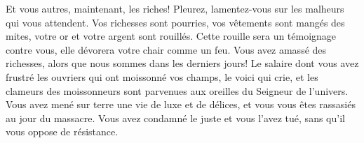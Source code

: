 Et vous autres, maintenant, les riches!
	Pleurez, lamentez-vous sur les malheurs qui vous attendent.
Vos richesses sont pourries, vos vêtements sont mangés des mites,
	votre or et votre argent sont rouillés.
Cette rouille sera un témoignage contre vous,
	elle dévorera votre chair comme un feu.
Vous avez amassé des richesses, alors que nous sommes dans les derniers jours!
Le salaire dont vous avez frustré les ouvriers qui ont moissonné vos champs,
	le voici qui crie, et les clameurs des moissonneurs
		sont parvenues aux oreilles du Seigneur de l’univers.
Vous avez mené sur terre une vie de luxe et de délices,
	et vous vous êtes rassasiés au jour du massacre.
Vous avez condamné le juste et vous l’avez tué,
	sans qu’il vous oppose de résistance.
